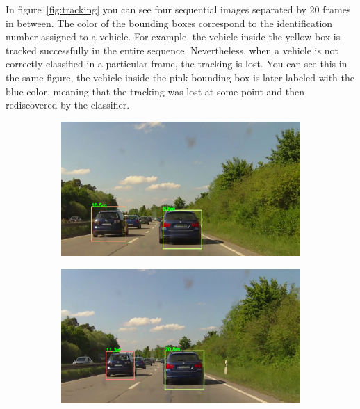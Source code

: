 In figure~\ref{fig:tracking} you can see four sequential images separated by 20
frames in between. The color of the bounding boxes correspond to the identification 
number assigned to a vehicle. For example, the vehicle inside the
yellow box is tracked successfully in the entire sequence. Nevertheless, when a
vehicle is not correctly classified in a particular frame, the tracking is lost.
You can see this in the same figure, the vehicle inside the pink bounding box is 
later labeled with the blue color, meaning that the tracking was lost at some point 
and then rediscovered by the classifier. 

\begin{figure}[t]
\centering
\begin{subfigure}[b]{0.4\textwidth}
\centering
\includegraphics[width=0.9\linewidth]{img/tracking1.jpg}
\vspace{5mm}
\end{subfigure}
\begin{subfigure}[b]{0.4\textwidth}
\centering
\includegraphics[width=0.9\linewidth]{img/tracking2.jpg}
\vspace{5mm}
\end{subfigure}
\begin{subfigure}[b]{0.4\textwidth}

\end{subfigure}
\end{figure}
